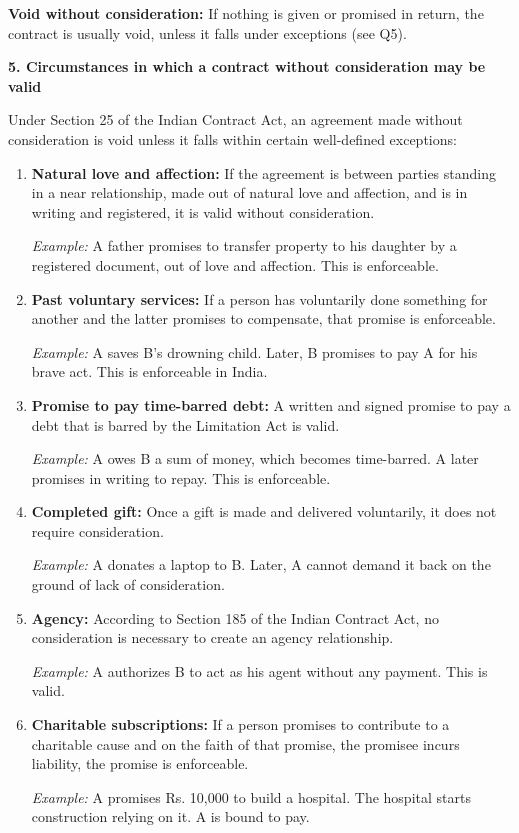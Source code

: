 \documentclass[12pt,a4paper]{book}
\begin{document}
\textbf{Void without consideration:} If nothing is given or promised in return, the contract is usually void, unless it falls under exceptions (see Q5).

\vspace{0.5cm}
\textbf{5. Circumstances in which a contract without consideration may be valid}

Under Section 25 of the Indian Contract Act, an agreement made without consideration is void unless it falls within certain well-defined exceptions:

\begin{enumerate}
    \item \textbf{Natural love and affection:} If the agreement is between parties standing in a near relationship, made out of natural love and affection, and is in writing and registered, it is valid without consideration.

    \textit{Example:} A father promises to transfer property to his daughter by a registered document, out of love and affection. This is enforceable.

    \item \textbf{Past voluntary services:} If a person has voluntarily done something for another and the latter promises to compensate, that promise is enforceable.

    \textit{Example:} A saves B’s drowning child. Later, B promises to pay A for his brave act. This is enforceable in India.

    \item \textbf{Promise to pay time-barred debt:} A written and signed promise to pay a debt that is barred by the Limitation Act is valid.

    \textit{Example:} A owes B a sum of money, which becomes time-barred. A later promises in writing to repay. This is enforceable.

    \item \textbf{Completed gift:} Once a gift is made and delivered voluntarily, it does not require consideration.

    \textit{Example:} A donates a laptop to B. Later, A cannot demand it back on the ground of lack of consideration.

    \item \textbf{Agency:} According to Section 185 of the Indian Contract Act, no consideration is necessary to create an agency relationship.

    \textit{Example:} A authorizes B to act as his agent without any payment. This is valid.

    \item \textbf{Charitable subscriptions:} If a person promises to contribute to a charitable cause and on the faith of that promise, the promisee incurs liability, the promise is enforceable.

    \textit{Example:} A promises Rs. 10,000 to build a hospital. The hospital starts construction relying on it. A is bound to pay.
\end{enumerate}
\end{document}
